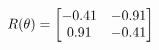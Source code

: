 \documentclass[preview]{standalone}
\begin{document}
\begin{align*}
\special{dvisvgm:raw <g id='unique000'>}R(\theta) = \begin{bmatrix}-0.41 & -0.91\\0.91 & -0.41\end{bmatrix}\special{dvisvgm:raw </g>}
\end{align*}
\end{document}
